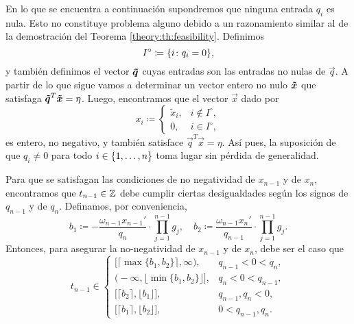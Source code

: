 En lo que se encuentra a continuación supondremos que ninguna entrada $q_i$ es nula. Esto no
constituye problema alguno debido a un razonamiento similar al de la demostración del Teorema
\ref{theory:th:feasibility}. Definimos
\begin{equation*}
	I^\circ \coloneq \lbrace i \colon q_i = 0 \rbrace,
\end{equation*}
y también definimos el vector $\boldsymbol{\tilde{q}}$ cuyas entradas son las entradas no nulas de
$\vec{q}$. A partir de lo que sigue vamos a determinar un vector entero no nulo $\boldsymbol{\tilde{x}}$
que satisfaga $\boldsymbol{\tilde{q}}^T\boldsymbol{\tilde{x}} = \eta$. Luego, encontramos que el vector $\vec{x}$
dado por
\begin{equation*}
	x_i \coloneq
	\begin{cases}
		\tilde{x}_i, & i \not \in I^\circ, \\
		0, & i \in I^\circ,
	\end{cases}
\end{equation*}
es entero, no negativo, y también satisface $\vec{q}^T\vec{x} = \eta$. Así pues, la suposición de
que $q_i \neq 0$ para todo $i \in \lbrace 1, \ldots, n \rbrace$ toma lugar sin pérdida de generalidad.

Para que se satisfagan las condiciones de no negatividad de $x_{n-1}$ y de $x_n$, encontramos que
$t_{n-1} \in \mathbb{Z}$ debe cumplir ciertas desigualdades según los signos de $q_{n-1}$ y de $q_n$.
Definamos, por conveniencia,
\begin{equation}
	\label{eq:lr-bounds}
	b_1 \coloneq -\frac{\omega_{n-1}x_{n-1}'}{q_n} \cdot \prod_{j=1}^{n-1}g_j, \quad
	b_2 \coloneq \frac{\omega_{n-1}x_{n}'}{q_{n-1}} \cdot \prod_{j=1}^{n-1}g_j.
\end{equation}
Entonces, para asegurar la no-negatividad de $x_{n - 1}$ y de $x_n$, debe ser el caso que
\begin{equation}
	\label{eq:feasible-param}
	t_{n-1} \in 
	\begin{cases}
		\big[ \lceil \max\lbrace b_1 ,  b_2 \rbrace \rceil, \infty \big), &  q_{n-1} < 0 < q_n, \\[0.5em]
		\big( -\infty, \lfloor \min\lbrace b_1, b_2\rbrace \rfloor \big], &  q_n < 0 < q_{n-1}, \\[0.5em]
		\big[ \lceil b_2 \rceil, \lfloor b_1 \rfloor \big], &  q_{n-1}, q_n < 0, \\[0.5em]
		\big[ \lceil b_1 \rceil, \lfloor b_2 \rfloor \big], &  0 < q_{n-1}, q_n.
	\end{cases}
\end{equation}

